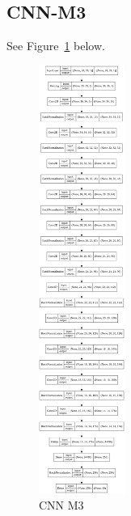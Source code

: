 \documentclass{article}
\begin{document}
\subsection{CNN-M3} \label{cnn_3}
See Figure~\ref{cnn_m3_demo} below.
\begin{figure}[h]
    \centering
    \includegraphics[width=0.25\textwidth]{figure/custom-m3.png}
    \caption{CNN M3}
    \label{cnn_m3_demo}
\end{figure}
\end{document}
